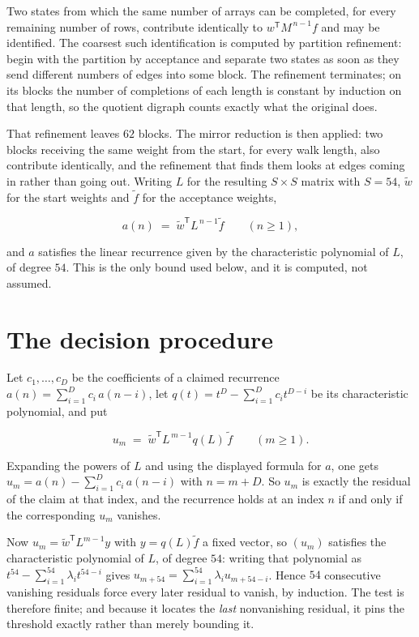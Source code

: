 \documentclass[11pt]{article}
\theoremstyle{definition}
\begin{document}
Two states from which the same number of arrays can be completed, for every remaining number of rows, contribute identically to $w^{\mathsf T}M^{\,n-1}f$ and may be identified. The coarsest such identification is computed by partition refinement: begin with the partition by acceptance and separate two states as soon as they send different numbers of edges into some block. The refinement terminates; on its blocks the number of completions of each length is constant by induction on that length, so the quotient digraph counts exactly what the original does.

That refinement leaves $62$ blocks. The mirror reduction is then applied: two blocks receiving the same weight from the start, for every walk length, also contribute identically, and the refinement that finds them looks at edges coming in rather than going out. Writing $L$ for the resulting $S \times S$ matrix with $S = 54$, $\tilde w$ for the start weights and $\tilde f$ for the acceptance weights,

\[a(n) \;=\; \tilde w^{\mathsf T} L^{\,n-1} \tilde f \qquad (n \ge 1),\]

and $a$ satisfies the linear recurrence given by the characteristic polynomial of $L$, of degree $54$. This is the only bound used below, and it is computed, not assumed.

\section{The decision procedure}

Let $c_1,\dots,c_D$ be the coefficients of a claimed recurrence $a(n) = \sum_{i=1}^{D} c_i\,a(n-i)$, let $q(t) = t^{D} - \sum_{i=1}^{D} c_i t^{D-i}$ be its characteristic polynomial, and put

\[u_m \;=\; \tilde w^{\mathsf T} L^{\,m-1} q(L)\,\tilde f \qquad (m \ge 1).\]

Expanding the powers of $L$ and using the displayed formula for $a$, one gets $u_m = a(n) - \sum_{i=1}^{D} c_i\,a(n-i)$ with $n = m + D$. So $u_m$ is exactly the residual of the claim at that index, and the recurrence holds at an index $n$ if and only if the corresponding $u_m$ vanishes.

Now $u_m = \tilde w^{\mathsf T} L^{m-1} y$ with $y = q(L)\tilde f$ a fixed vector, so $(u_m)$ satisfies the characteristic polynomial of $L$, of degree $54$: writing that polynomial as $t^{54} - \sum_{i=1}^{54} \lambda_i t^{54-i}$ gives $u_{m+54} = \sum_{i=1}^{54} \lambda_i u_{m+54-i}$. Hence $54$ consecutive vanishing residuals force every later residual to vanish, by induction. The test is therefore finite; and because it locates the {\itshape last} nonvanishing residual, it pins the threshold exactly rather than merely bounding it.
\end{document}
